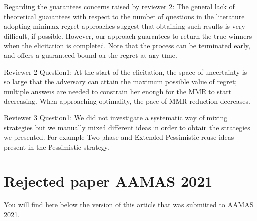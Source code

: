\documentclass[version=3.21, pagesize, twoside=off, bibliography=totoc, DIV=calc, fontsize=12pt, a4paper]{scrartcl}
\begin{document}
Regarding the guarantees concerns raised by reviewer 2: The general lack of theoretical guarantees with respect to the number of questions in the literature adopting minimax regret approaches suggest that obtaining such results is very difficult, if possible. However, our approach guarantees to return the true winners when the elicitation is completed. Note that the process can be terminated early, and offers a guaranteed bound on the regret at any time.

Reviewer 2 Question1: At the start of the elicitation, the space of uncertainty is so large that the adversary can attain the maximum possible value of regret; multiple answers are needed to constrain her enough for the MMR to start decreasing. When approaching optimality, the pace of MMR reduction decreases.

Reviewer 3 Question1: We did not investigate a systematic way of mixing strategies but we manually mixed different ideas in order to obtain the strategies we presented. For example Two phase and Extended Pessimistic reuse ideas present in the Pessimistic strategy.

\section{Rejected paper AAMAS 2021}
You will find here below the version of this article that was submitted to AAMAS 2021.

\end{document}
